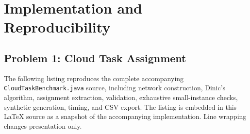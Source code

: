 \documentclass[conference]{IEEEtran}
\theoremstyle{definition}
\theoremstyle{remark}
\begin{document}
\appendices
\section{Implementation and Reproducibility}
\label{app:java-source}\label{app:code}

\subsection{Problem 1: Cloud Task Assignment}
The following listing reproduces the complete accompanying
\texttt{CloudTaskBenchmark.java} source, including network construction,
Dinic's algorithm, assignment extraction, validation, exhaustive small-instance
checks, synthetic generation, timing, and CSV export. The listing is embedded in this LaTeX source as a snapshot of the accompanying
implementation. Line wrapping changes presentation only.
\end{document}
